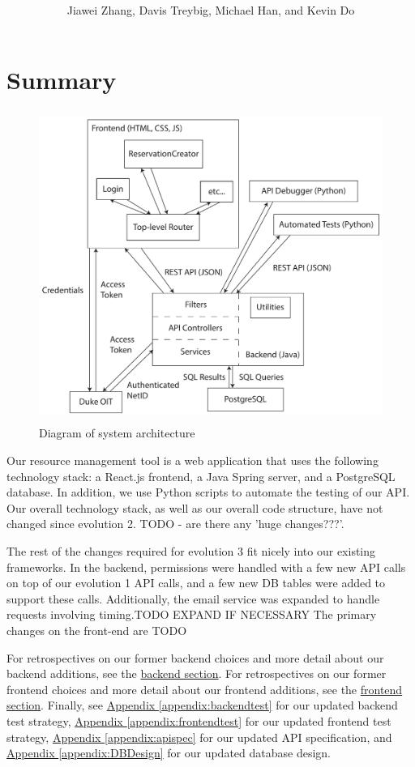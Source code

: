 \documentclass[12pt]{article}
\title{\horrule{5pt}\\\vspace{0.4cm}{\bf \mytitle}\\}
\author{Jiawei Zhang, Davis Treybig, Michael Han, and Kevin Do}
\date{\horrule{1pt}}
\begin{document}
\maketitle{}
\section{Summary}
\begin{figure}[h]
\begin{center}
\includegraphics[height=4in]{../ev2/ev2_design_cropped.pdf}
\end{center}
\caption{Diagram of system architecture}
\label{fig:design}
\end{figure}

Our resource management tool is a web application that uses the following technology stack: a React.js frontend, a Java Spring server, and a PostgreSQL database. In addition, we use Python scripts to automate the testing of our API. Our overall technology stack, as well as our overall code structure, have not changed since evolution 2. {\huge TODO - are there any 'huge changes???'}.

The rest of the changes required for evolution 3 fit nicely into our existing frameworks. In the backend, permissions were handled with a few new API calls on top of our evolution 1 API calls, and a few new DB tables were added to support these calls. Additionally, the email service was expanded to handle requests involving timing.{\huge TODO EXPAND IF NECESSARY} The primary changes on the front-end are {\huge TODO}

For retrospectives on our former backend choices and more detail about our backend additions, see the \hyperref[sec:Backend]{backend section}. For retrospectives on our former frontend choices and more detail about our frontend additions, see the \hyperref[sec:Frontend]{frontend section}. Finally, see \hyperref[appendix:backendtest]{Appendix \ref{appendix:backendtest}} for our updated backend test strategy,  \hyperref[appendix:frontendtest]{Appendix \ref{appendix:frontendtest}} for our updated frontend test strategy, \hyperref[appendix:apispec]{Appendix \ref{appendix:apispec}} for our updated API specification, and \hyperref[appendix:DBDesign]{Appendix \ref{appendix:DBDesign}} for our updated database design. 
\end{document}

